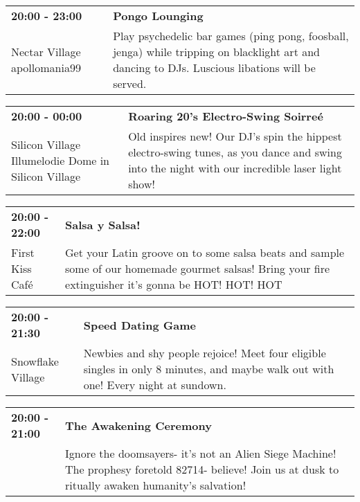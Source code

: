 \begin{tabular}{ p{1in} p{2.2in} }
    \textbf{20:00 - 23:00} & \textbf{Pongo Lounging} \\
    Nectar Village \newline apollomania99 & Play psychedelic bar games (ping pong, foosball, jenga) while tripping on blacklight art and dancing to DJs. Luscious libations will be served. \\
    \hline 
\end{tabular}
    
\begin{tabular}{ p{1in} p{2.2in} }
    \textbf{20:00 - 00:00} & \textbf{Roaring 20's Electro-Swing Soirre\'e} \\
    Silicon Village \newline Illumelodie Dome in Silicon Village & Old inspires new! Our DJ's spin the hippest electro-swing tunes, as you dance and swing into the night with our incredible laser light show! \\
    \hline 
\end{tabular}
    
\begin{tabular}{ p{1in} p{2.2in} }
    \textbf{20:00 - 22:00} & \textbf{Salsa y Salsa!} \\
    First Kiss Caf\'e \newline  & Get your Latin groove on to some salsa beats and sample some of our homemade gourmet salsas!  Bring your fire extinguisher it's gonna be HOT! HOT! HOT \\
    \hline 
\end{tabular}
    
\begin{tabular}{ p{1in} p{2.2in} }
    \textbf{20:00 - 21:30} & \textbf{Speed Dating Game} \\
    Snowflake Village \newline  & Newbies and shy people rejoice! Meet four eligible singles in only 8 minutes, and maybe walk out with one! Every night at sundown. \\
    \hline 
\end{tabular}
    
\begin{tabular}{ p{1in} p{2.2in} }
    \textbf{20:00 - 21:00} & \textbf{The Awakening Ceremony} \\
    ~ \newline  & Ignore the doomsayers- it's not an Alien Siege Machine! The prophesy foretold 82714- believe! Join us at dusk to ritually awaken humanity's salvation! \\
    \hline 
\end{tabular}
    
